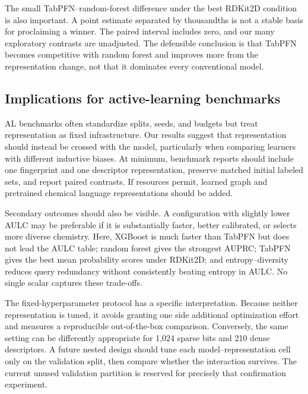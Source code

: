 \documentclass[twoside,11pt]{article}
\begin{document}
The small TabPFN--random-forest difference under the best RDKit2D condition is also important. A point estimate separated by thousandths is not a stable basis for proclaiming a winner. The paired interval includes zero, and our many exploratory contrasts are unadjusted. The defensible conclusion is that TabPFN becomes competitive with random forest and improves more from the representation change, not that it dominates every conventional model.

\subsection{Implications for active-learning benchmarks}
AL benchmarks often standardize splits, seeds, and budgets but treat representation as fixed infrastructure. Our results suggest that representation should instead be crossed with the model, particularly when comparing learners with different inductive biases. At minimum, benchmark reports should include one fingerprint and one descriptor representation, preserve matched initial labeled sets, and report paired contrasts. If resources permit, learned graph and pretrained chemical language representations should be added.

Secondary outcomes should also be visible. A configuration with slightly lower AULC may be preferable if it is substantially faster, better calibrated, or selects more diverse chemistry. Here, XGBoost is much faster than TabPFN but does not lead the AULC table; random forest gives the strongest AUPRC; TabPFN gives the best mean probability scores under RDKit2D; and entropy--diversity reduces query redundancy without consistently beating entropy in AULC. No single scalar captures these trade-offs.

The fixed-hyperparameter protocol has a specific interpretation. Because neither representation is tuned, it avoids granting one side additional optimization effort and measures a reproducible out-of-the-box comparison. Conversely, the same setting can be differently appropriate for 1,024 sparse bits and 210 dense descriptors. A future nested design should tune each model--representation cell only on the validation split, then compare whether the interaction survives. The current unused validation partition is reserved for precisely that confirmation experiment.
\end{document}
